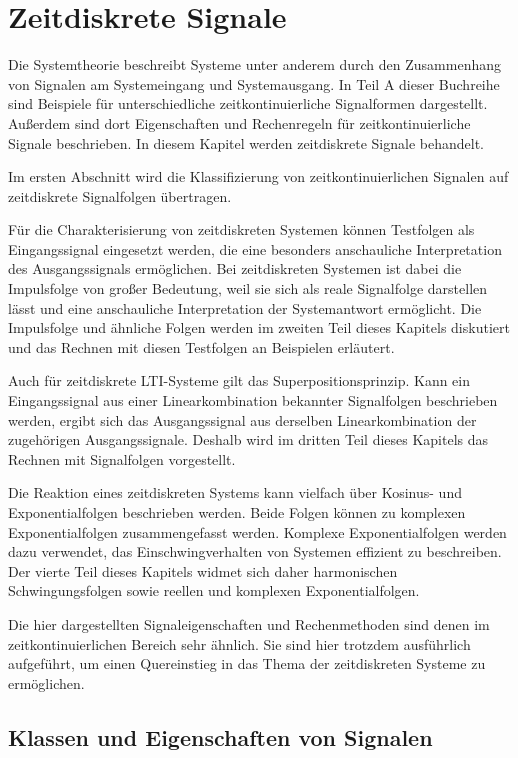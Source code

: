 \chapter{\texorpdfstring{Zeitdiskrete Signale }{Zeitdiskrete Signale }}\label{zeitdiskrete-signale}

Die Systemtheorie beschreibt Systeme unter anderem durch den Zusammenhang von Signalen am Systemeingang und Systemausgang. In Teil A dieser Buchreihe sind Beispiele für unterschiedliche zeitkontinuierliche Signalformen dargestellt. Außerdem sind dort Eigenschaften und Rechenregeln für zeitkontinuierliche Signale beschrieben. In diesem Kapitel werden zeitdiskrete Signale behandelt.

Im ersten Abschnitt wird die Klassifizierung von zeitkontinuierlichen Signalen auf zeitdiskrete Signalfolgen übertragen.

Für die Charakterisierung von zeitdiskreten Systemen können Testfolgen als Eingangssignal eingesetzt werden, die eine besonders anschauliche Interpretation des Ausgangssignals ermöglichen. Bei zeitdiskreten Systemen ist dabei die Impulsfolge von großer Bedeutung, weil sie sich als reale Signalfolge darstellen lässt und eine anschauliche Interpretation der Systemantwort ermöglicht. Die Impulsfolge und ähnliche Folgen werden im zweiten Teil dieses Kapitels diskutiert und das Rechnen mit diesen Testfolgen an Beispielen erläutert.

Auch für zeitdiskrete LTI-Systeme gilt das Superpositionsprinzip. Kann ein Eingangssignal aus einer Linearkombination bekannter Signalfolgen beschrieben werden, ergibt sich das Ausgangssignal aus derselben Linearkombination der zugehörigen Ausgangssignale. Deshalb wird im dritten Teil dieses Kapitels das Rechnen mit Signalfolgen vorgestellt.

Die Reaktion eines zeitdiskreten Systems kann vielfach über Kosinus- und Exponentialfolgen beschrieben werden. Beide Folgen können zu komplexen Exponentialfolgen zusammengefasst werden. Komplexe Exponentialfolgen werden dazu verwendet, das Einschwingverhalten von Systemen effizient zu beschreiben. Der vierte Teil dieses Kapitels widmet sich daher harmonischen Schwingungsfolgen sowie reellen und komplexen Exponentialfolgen.

Die hier dargestellten Signaleigenschaften und Rechenmethoden sind denen im zeitkontinuierlichen Bereich sehr ähnlich. Sie sind hier trotzdem ausführlich aufgeführt, um einen Quereinstieg in das Thema der zeitdiskreten Systeme zu ermöglichen.

\section{Klassen und Eigenschaften von Signalen}\label{sec:3.1}

